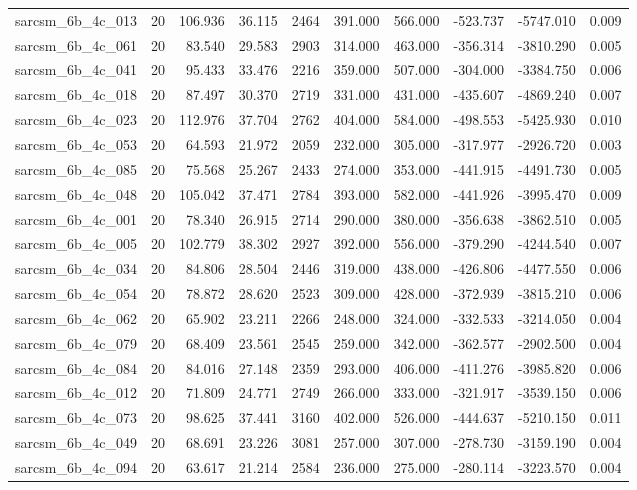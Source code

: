 \begin{tabular}{lrrrrrrrrr}
sarcsm\_6b\_4c\_013 & 20 & 106.936 & 36.115 & 2464 & 391.000 & 566.000 & -523.737 & -5747.010 & 0.009 \\
sarcsm\_6b\_4c\_061 & 20 & 83.540 & 29.583 & 2903 & 314.000 & 463.000 & -356.314 & -3810.290 & 0.005 \\
sarcsm\_6b\_4c\_041 & 20 & 95.433 & 33.476 & 2216 & 359.000 & 507.000 & -304.000 & -3384.750 & 0.006 \\
sarcsm\_6b\_4c\_018 & 20 & 87.497 & 30.370 & 2719 & 331.000 & 431.000 & -435.607 & -4869.240 & 0.007 \\
sarcsm\_6b\_4c\_023 & 20 & 112.976 & 37.704 & 2762 & 404.000 & 584.000 & -498.553 & -5425.930 & 0.010 \\
sarcsm\_6b\_4c\_053 & 20 & 64.593 & 21.972 & 2059 & 232.000 & 305.000 & -317.977 & -2926.720 & 0.003 \\
sarcsm\_6b\_4c\_085 & 20 & 75.568 & 25.267 & 2433 & 274.000 & 353.000 & -441.915 & -4491.730 & 0.005 \\
sarcsm\_6b\_4c\_048 & 20 & 105.042 & 37.471 & 2784 & 393.000 & 582.000 & -441.926 & -3995.470 & 0.009 \\
sarcsm\_6b\_4c\_001 & 20 & 78.340 & 26.915 & 2714 & 290.000 & 380.000 & -356.638 & -3862.510 & 0.005 \\
sarcsm\_6b\_4c\_005 & 20 & 102.779 & 38.302 & 2927 & 392.000 & 556.000 & -379.290 & -4244.540 & 0.007 \\
sarcsm\_6b\_4c\_034 & 20 & 84.806 & 28.504 & 2446 & 319.000 & 438.000 & -426.806 & -4477.550 & 0.006 \\
sarcsm\_6b\_4c\_054 & 20 & 78.872 & 28.620 & 2523 & 309.000 & 428.000 & -372.939 & -3815.210 & 0.006 \\
sarcsm\_6b\_4c\_062 & 20 & 65.902 & 23.211 & 2266 & 248.000 & 324.000 & -332.533 & -3214.050 & 0.004 \\
sarcsm\_6b\_4c\_079 & 20 & 68.409 & 23.561 & 2545 & 259.000 & 342.000 & -362.577 & -2902.500 & 0.004 \\
sarcsm\_6b\_4c\_084 & 20 & 84.016 & 27.148 & 2359 & 293.000 & 406.000 & -411.276 & -3985.820 & 0.006 \\
sarcsm\_6b\_4c\_012 & 20 & 71.809 & 24.771 & 2749 & 266.000 & 333.000 & -321.917 & -3539.150 & 0.006 \\
sarcsm\_6b\_4c\_073 & 20 & 98.625 & 37.441 & 3160 & 402.000 & 526.000 & -444.637 & -5210.150 & 0.011 \\
sarcsm\_6b\_4c\_049 & 20 & 68.691 & 23.226 & 3081 & 257.000 & 307.000 & -278.730 & -3159.190 & 0.004 \\
sarcsm\_6b\_4c\_094 & 20 & 63.617 & 21.214 & 2584 & 236.000 & 275.000 & -280.114 & -3223.570 & 0.004 \\

\end{tabular}
